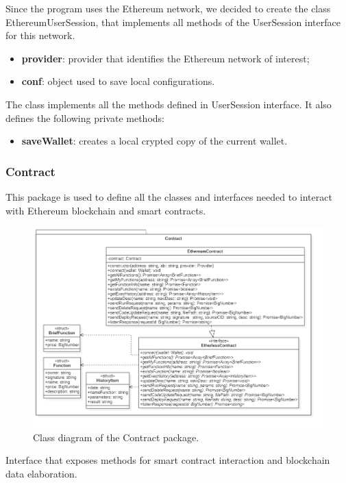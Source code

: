 			Since the program uses the Ethereum network, we decided to create the class EthereumUserSession, that implements all methods of the UserSession interface for this network.
					\begin{itemize}
						\item \textbf{provider}: provider that identifies the Ethereum network of interest; 
						\item \textbf{conf}: object used to save local configurations.
					\end{itemize}
				
				The class implements all the methods defined in UserSession interface. It also defines the following private methods: 
					\begin{itemize}
						\item\textbf{saveWallet}: creates a local crypted copy of the current wallet. 
					\end{itemize}
				
		\subsubsection{Contract} 
		This package is used to define all the classes and interfaces needed to interact with Ethereum blockchain and smart contracts. 
		\begin{figure} [h!]
			\centering
			\includegraphics[width=0.75\linewidth]{diagrammi/etherless-cli/Contract}
			\caption{Class diagram of the Contract package.}
		\end{figure}
	
			Interface that exposes methods for smart contract interaction and blockchain data elaboration. 	
			
